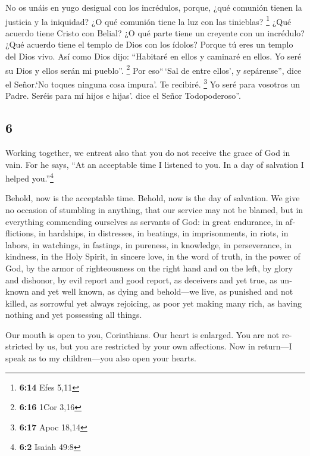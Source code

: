 \begin{paracol}{2}
 No os unáis en yugo desigual con los incrédulos, porque,
¿qué comunión tienen la justicia y la iniquidad? ¿O qué comunión tiene
la luz con las tinieblas? \footnote{\textbf{6:14} Efes 5,11}
 ¿Qué acuerdo tiene Cristo con Belial? ¿O qué parte tiene
un creyente con un incrédulo?  ¿Qué acuerdo tiene el
templo de Dios con los ídolos? Porque tú eres un templo del Dios vivo.
Así como Dios dijo: ``Habitaré en ellos y caminaré en ellos. Yo seré su
Dios y ellos serán mi pueblo''. \footnote{\textbf{6:16} 1Cor 3,16}
 Por eso``\,`Sal de entre ellos', y sepárense'', dice el
Señor.`No toques ninguna cosa impura'. Te recibiré. \footnote{\textbf{6:17}
  Apoc 18,14}  Yo seré para vosotros un Padre. Seréis
para mí hijos e hijas'. dice el Señor Todopoderoso''.

\switchcolumn
\begin{otherlanguage}{english}

\hypertarget{section-11}{%
\section{6}\label{section-11}}

 Working together, we entreat also that you do not receive
the grace of God in vain.  For he says, ``At an acceptable
time I listened to you. In a day of salvation I helped you.''\footnote{\textbf{6:2}
  Isaiah 49:8}

Behold, now is the acceptable time. Behold, now is the day of salvation.
 We give no occasion of stumbling in anything, that our
service may not be blamed,  but in everything commending
ourselves as servants of God: in great endurance, in afflictions, in
hardships, in distresses,  in beatings, in imprisonments,
in riots, in labors, in watchings, in fastings,  in
pureness, in knowledge, in perseverance, in kindness, in the Holy
Spirit, in sincere love,  in the word of truth, in the
power of God, by the armor of righteousness on the right hand and on the
left,  by glory and dishonor, by evil report and good
report, as deceivers and yet true,  as unknown and yet
well known, as dying and behold---we live, as punished and not killed,
 as sorrowful yet always rejoicing, as poor yet making
many rich, as having nothing and yet possessing all things.

 Our mouth is open to you, Corinthians. Our heart is
enlarged.  You are not restricted by us, but you are
restricted by your own affections.  Now in return---I
speak as to my children---you also open your hearts.


\end{otherlanguage}
\end{paracol}
